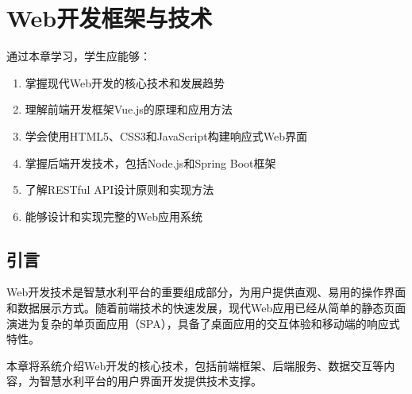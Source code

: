 \chapter{Web开发框架与技术}

\begin{learningobjectives}
通过本章学习，学生应能够：
\begin{enumerate}
    \item 掌握现代Web开发的核心技术和发展趋势
    \item 理解前端开发框架Vue.js的原理和应用方法
    \item 学会使用HTML5、CSS3和JavaScript构建响应式Web界面
    \item 掌握后端开发技术，包括Node.js和Spring Boot框架
    \item 了解RESTful API设计原则和实现方法
    \item 能够设计和实现完整的Web应用系统
\end{enumerate}
\end{learningobjectives}

\section{引言}

Web开发技术是智慧水利平台的重要组成部分，为用户提供直观、易用的操作界面和数据展示方式。随着前端技术的快速发展，现代Web应用已经从简单的静态页面演进为复杂的单页面应用（SPA），具备了桌面应用的交互体验和移动端的响应式特性。

本章将系统介绍Web开发的核心技术，包括前端框架、后端服务、数据交互等内容，为智慧水利平台的用户界面开发提供技术支撑。

